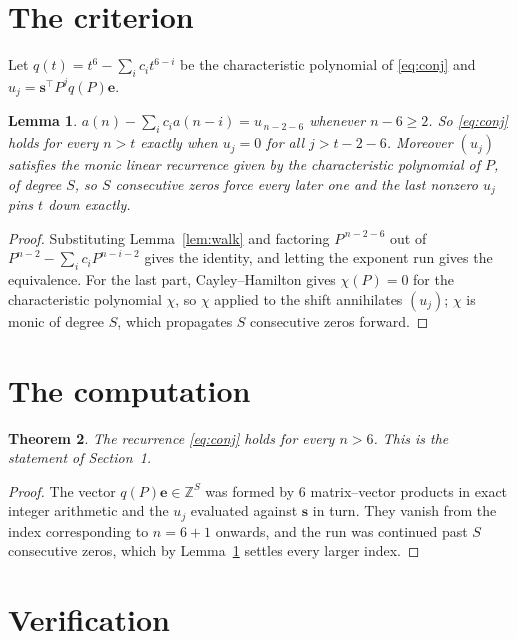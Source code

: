 \documentclass[11pt,a4paper]{article}
\theoremstyle{plain}
\newtheorem{theorem}{Theorem}
\newtheorem{lemma}[theorem]{Lemma}
\theoremstyle{definition}
\begin{document}
\section{The criterion}

Let $q(t)=t^{6}-\sum_i c_i t^{6-i}$ be the characteristic polynomial of
\eqref{eq:conj} and $u_j=\mathbf{s}^{\!\top}P^{j}q(P)\mathbf{e}$.

\begin{lemma}\label{lem:crit}
$a(n)-\sum_i c_i a(n-i)=u_{\,n-2-6}$ whenever $n-6\ge2$. So \eqref{eq:conj}
holds for every $n>t$ exactly when $u_j=0$ for all $j>t-2-6$. Moreover $(u_j)$
satisfies the monic linear recurrence given by the characteristic polynomial of $P$, of
degree $S$, so $S$ consecutive zeros force every later one and the last nonzero $u_j$ pins
$t$ down exactly.
\end{lemma}

\begin{proof}
Substituting Lemma~\ref{lem:walk} and factoring $P^{\,n-2-6}$ out of
$P^{n-2}-\sum_i c_i P^{n-i-2}$ gives the identity, and letting the exponent run gives the
equivalence. For the last part, Cayley--Hamilton gives $\chi(P)=0$ for the characteristic
polynomial $\chi$, so $\chi$ applied to the shift annihilates $(u_j)$; $\chi$ is monic of
degree $S$, which propagates $S$ consecutive zeros forward.
\end{proof}

\section{The computation}

\begin{theorem}
The recurrence \eqref{eq:conj} holds for every $n>6$. This is the statement of
Section~1.
\end{theorem}

\begin{proof}
The vector $q(P)\mathbf{e}\in\mathbb{Z}^{S}$ was formed by $6$ matrix--vector
products in exact integer arithmetic and the $u_j$ evaluated against $\mathbf{s}$ in turn.
They vanish from the index corresponding to $n=6+1$ onwards, and the run was continued
past $S$ consecutive zeros, which by Lemma~\ref{lem:crit} settles every larger index.
\end{proof}

\section{Verification}
\end{document}
